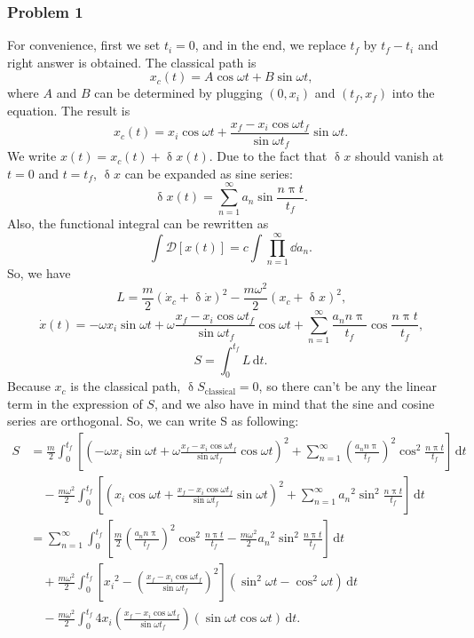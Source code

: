 \documentclass[english,log-declarations=false]{article}
\begin{document}
\newcommand{\lb}{\left(}
\newcommand{\rb}{\right)}
\newcommand{\ec}{\text{,}}
\newcommand{\ed}{\text{.}}
\newcommand{\bt}{\lb t\rb}
\newcommand{\deltaup}{\updelta}
\newcommand{\piup}{\uppi}
\newcommand{\ndd}{\,\mathrm{d}}
\subsubsection*{Problem 1}
For convenience, first we set $t_i=0$, and in the end, we replace $t_f$ by $t_f-t_i$ and right answer is obtained.
The classical path is \[x_c\lb t\rb=A \cos\omega t+B\sin \omega t\ec\]where $A$ and $B$ can be determined by plugging $\lb0,x_i\rb$ and $\lb t_f, x_f\rb$ into the equation. The result is
\[x_c\lb t\rb=x_i \cos\omega t+\frac{x_f-x_i\cos\omega t_f}{\sin\omega t_f}\sin \omega t\ed\]
We write $x\lb t\rb=x_c\lb t\rb+\deltaup x\bt$. Due to the fact that $\deltaup x$ should vanish at $t=0$ and $t=t_f$, $\deltaup x$ can be expanded as sine series: \[\deltaup x\bt=\sum_{n=1}^\infty a_n\sin\frac{n\piup t}{t_f}\ed\]
Also, the functional integral can be rewritten as \[\int\mathcal{D}\left[x\bt\right]=c\int\prod_{n=1}^\infty \dd a_n\ed\]
So, we have
\[L=\frac{m}{2}\lb\dot{x}_c+\deltaup\dot{x}\rb^2-\frac{m\omega^2}{2}\lb x_c+\deltaup x\rb^2\ec\]
\[\dot{x}\bt=-\omega x_i \sin\omega t +\omega \frac{x_f-x_i\cos\omega t_f}{\sin\omega t_f}\cos\omega t+\sum_{n=1}^\infty\frac{a_n n \piup}{t_f}\cos\frac{n \piup t}{t_f}\ec\]
\[S=\int_0^{t_f} L\ndd t\ed\]
Because $x_c$ is the classical path, $\deltaup S_\text{classical}=0$, so there can't be any the linear term in the expression of $S$, and we also have in mind that the sine and cosine series are orthogonal. So, we can write S as following:
\[\begin{split}S&{}=\frac{m}{2}\int_0^{t_f}\left[\lb-\omega x_i\sin\omega t+\omega \frac{x_f-x_i\cos\omega t_f}{\sin\omega t_f}\cos\omega t\rb^2+\sum_{n=1}^\infty\lb\frac{a_n n \piup}{t_f}\rb^2\cos^2\frac{n \piup t}{t_f}\right]\ndd t\\%
&\quad{}-\frac{m\omega^2}{2}\int_0^{t_f}\left[\lb x_i\cos\omega t+ \frac{x_f-x_i\cos\omega t_f}{\sin\omega t_f}\sin\omega t\rb^2+\sum_{n=1}^\infty {a_n}^2\sin^2\frac{n \piup t}{t_f}\right]\ndd t\\%
&{}=\sum_{n=1}^\infty\int_0^{t_f}\left[\frac{m}{2}\lb\frac{a_n n \piup}{t_f}\rb^2\cos^2\frac{n \piup t}{t_f}-\frac{m\omega^2}{2}{a_n}^2\sin^2\frac{n \piup t}{t_f}\right]\ndd t\\%
&\quad{}+\frac{m\omega^2}{2}\int_0^{t_f}\left[ {x_i}^2-\lb\frac{x_f-x_i\cos\omega t_f}{\sin\omega t_f}\rb^2\right]\lb\sin^2\omega t-\cos^2\omega t\rb\ndd t\\%
&\quad{}-\frac{m\omega^2}{2}\int_0^{t_f}4 {x_i}\lb\frac{x_f-x_i\cos\omega t_f}{\sin\omega t_f}\rb\lb\sin\omega t\cos\omega t\rb\ndd t\ed\end{split}\]
\end{document}

